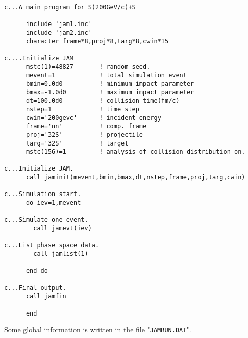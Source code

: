 \documentclass[]{article}
\newcommand{\ttt}[1]{{\tt#1}}
\begin{document}
\begin{verbatim}
c...A main program for S(200GeV/c)+S

      include 'jam1.inc'
      include 'jam2.inc'
      character frame*8,proj*8,targ*8,cwin*15

c....Initialize JAM
      mstc(1)=48827       ! random seed.
      mevent=1            ! total simulation event
      bmin=0.0d0          ! minimum impact parameter
      bmax=-1.0d0         ! maximum impact parameter
      dt=100.0d0          ! collision time(fm/c)
      nstep=1             ! time step
      cwin='200gevc'      ! incident energy
      frame='nn'          ! comp. frame
      proj='32S'          ! projectile
      targ='32S'          ! target
      mstc(156)=1         ! analysis of collision distribution on.

c...Initialize JAM.
      call jaminit(mevent,bmin,bmax,dt,nstep,frame,proj,targ,cwin)

c...Simulation start.
      do iev=1,mevent

c...Simulate one event.
        call jamevt(iev)

c...List phase space data.
        call jamlist(1)

      end do

c...Final output.
      call jamfin

      end
\end{verbatim}


Some global information is written in the file "\ttt{JAMRUN.DAT}". 
\end{document}
